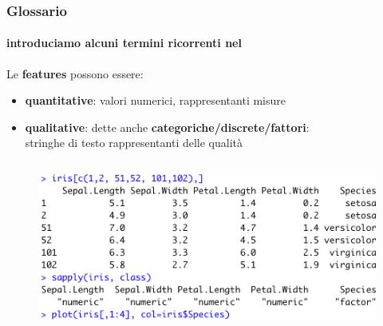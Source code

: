 \begin{frame}

	\frametitle{Glossario}
	\framesubtitle{introduciamo alcuni termini ricorrenti nel \ml}

	\begin{block}{}
		Le \textbf{features} possono essere:
		\begin{itemize}
			\item \textbf{quantitative}: valori numerici, rappresentanti misure
			\item \textbf{qualitative}: dette anche \textbf{categoriche/discrete/fattori}:\\
				stringhe di testo rappresentanti delle qualità
		\end{itemize}
		\pause
		
		\begin{columns}
			
			\begin{figure}[!htbp]
				\includegraphics[width=1.0\linewidth]{images/glossary/iris_1.png}
			\end{figure}
			
		\end{columns}
		
	\end{block}

\end{frame}





